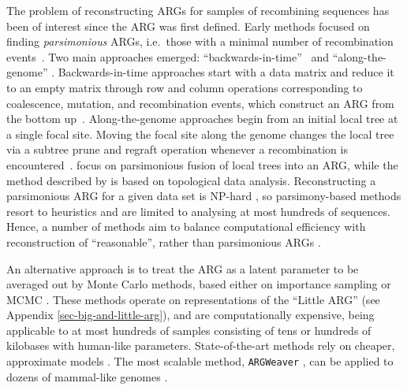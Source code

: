 \documentclass{article}
\begin{document}
The problem of reconstructing ARGs for samples of recombining sequences has
been of interest since the ARG was first defined. Early methods focused on
finding \emph{parsimonious} ARGs, i.e.\ those with a minimal number of
recombination events~\citep{hein1990reconstructing}. Two main approaches
emerged: ``backwards-in-time''~\citep{lyngso2005minimum} and
``along-the-genome'' \citep{song2003parsimonious, song2005constructing}.
Backwards-in-time approaches
start with a data matrix and reduce it to an empty matrix through row
and column operations corresponding to coalescence, mutation, and recombination
events, which construct an ARG from the bottom up~\citep{song2005efficient,
wu2008association,thao2019hybrid,ignatieva2021kwarg}.
Along-the-genome approaches
begin from an initial local tree at a single focal site.
Moving the focal site along the
genome changes the local tree via a subtree prune and regraft
operation whenever a recombination is encountered~\citep{hein1993heuristic,
wu2011new, mirzaei2017rent}.
\citet{rasmussen2022espalier} focus on parsimonious fusion of local
trees into an ARG, while the method described by
\citet{camara2016inference} is based on topological data analysis.
Reconstructing a parsimonious ARG for a given data set is NP-hard
\citep{wang2001perfect}, so parsimony-based methods resort to heuristics and
are limited to analysing at most hundreds of sequences. Hence, a number of
methods aim to balance computational efficiency with reconstruction of
``reasonable'', rather than parsimonious ARGs
\citep{minichiello2006mapping,
parida2008estimating, kelleher2019inferring,  speidel2019method,
schaefer2021ancestral, zhang2023biobank}.


An alternative approach is to treat the ARG as a latent parameter to be
averaged out by Monte Carlo methods, based either on importance sampling
\citep{griffiths1996ancestral, fearnhead2001estimating, jenkins2011inference}
or MCMC \citep{kuhner2000maximum, kuhner2006lamarc, nielsen2000estimation, wang2008bayesian,
wang2009population, fallon2013acg, vaughan2017inferring, mahmoudi2022bayesian}.
These methods operate on representations
of the ``Little ARG'' (see Appendix \ref{sec-big-and-little-arg}), and are computationally expensive, being
applicable to at most hundreds of samples consisting of tens or hundreds of
kilobases with human-like parameters.
State-of-the-art methods rely on cheaper,
approximate models \citep{didelot2010inference, heine2018bridging,
hubisz2020mapping,hubisz2020inference, medina2020speeding}. The most scalable
method, \texttt{ARGWeaver} \citep{rasmussen2014genome}, can be applied to
dozens of mammal-like genomes \citep{hubisz2020inference}.
\end{document}
